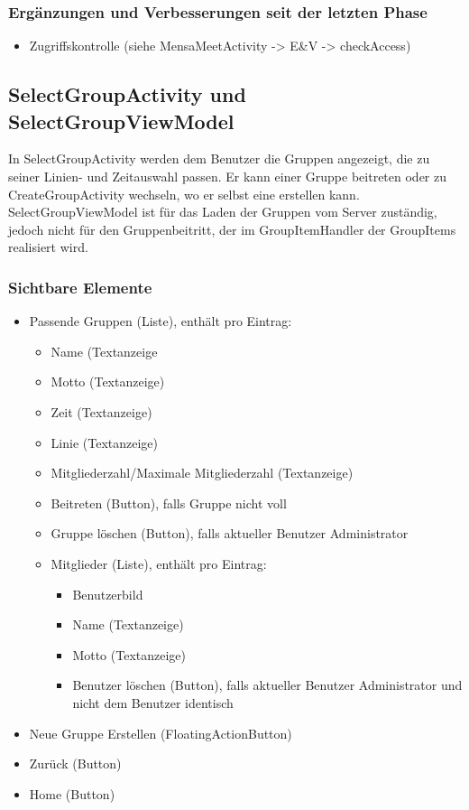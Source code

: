 \documentclass[a4paper]{scrreprt}
\begin{document}
\subsubsection{Ergänzungen und Verbesserungen seit der letzten Phase}
\begin{itemize}
\item Zugriffskontrolle (siehe MensaMeetActivity -> E\&V -> checkAccess)
\end{itemize}

\subsection{SelectGroupActivity und SelectGroupViewModel}
In SelectGroupActivity werden dem Benutzer die Gruppen angezeigt, die zu seiner Linien- und Zeitauswahl passen. Er kann einer Gruppe beitreten oder zu CreateGroupActivity wechseln, wo er selbst eine erstellen kann. SelectGroupViewModel ist für das Laden der Gruppen vom Server zuständig, jedoch nicht für den Gruppenbeitritt, der im GroupItemHandler der GroupItems realisiert wird.

\subsubsection{Sichtbare Elemente}
\begin{itemize}
\item Passende Gruppen (Liste), enthält pro Eintrag:

\begin{itemize}
\item Name (Textanzeige
\item Motto (Textanzeige)
\item Zeit (Textanzeige)
\item Linie (Textanzeige)
\item Mitgliederzahl/Maximale Mitgliederzahl (Textanzeige)
\item Beitreten (Button), falls Gruppe nicht voll
\item Gruppe löschen (Button), falls aktueller Benutzer Administrator
\item Mitglieder (Liste), enthält pro Eintrag:

\begin{itemize}
\item Benutzerbild
\item Name (Textanzeige)
\item Motto (Textanzeige)
\item Benutzer löschen (Button), falls aktueller Benutzer Administrator und nicht dem Benutzer identisch
\end{itemize}
\end{itemize}

\item Neue Gruppe Erstellen (FloatingActionButton)
\item Zurück (Button)
\item Home (Button)
\end{itemize}
\end{document}
